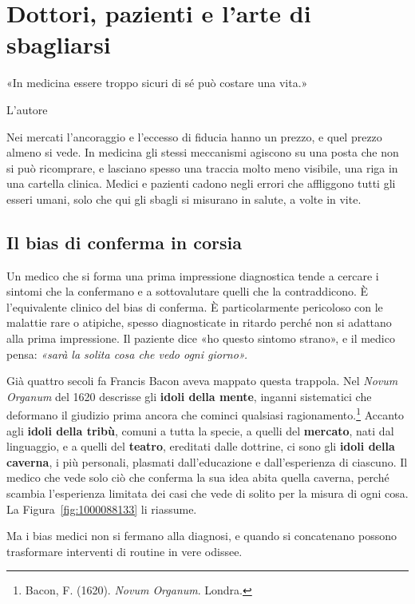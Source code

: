 \chapter{Dottori, pazienti e l'arte di sbagliarsi}
\label{cap:p2c15}

\epigraph{«In medicina essere troppo sicuri di sé può costare una vita.»}{L'autore}

Nei mercati l'ancoraggio e l'eccesso di fiducia hanno un prezzo, e quel prezzo almeno si vede. In medicina gli stessi meccanismi agiscono su una posta che non si pu\`{o} ricomprare, e lasciano spesso una traccia molto meno visibile, una riga in una cartella clinica. Medici e pazienti cadono negli errori che affliggono tutti gli esseri umani, solo che qui gli sbagli si misurano in salute, a volte in vite.

\section{Il bias di conferma in corsia}

Un medico che si forma una prima impressione diagnostica tende a cercare i sintomi che la confermano e a sottovalutare quelli che la contraddicono. \`{E} l'equivalente clinico del bias di conferma. \`{E} particolarmente pericoloso con le malattie rare o atipiche, spesso diagnosticate in ritardo perch\'{e} non si adattano alla prima impressione. Il paziente dice «ho questo sintomo strano», e il medico pensa: \textit{«sar\`{a} la solita cosa che vedo ogni giorno».}

Gi\`{a} quattro secoli fa Francis Bacon aveva mappato questa trappola. Nel \textit{Novum Organum} del 1620 descrisse gli \textbf{idoli della mente}, inganni sistematici che deformano il giudizio prima ancora che cominci qualsiasi ragionamento.\footnote{Bacon, F. (1620). \textit{Novum Organum}. Londra.} Accanto agli \textbf{idoli della trib\`{u}}, comuni a tutta la specie, a quelli del \textbf{mercato}, nati dal linguaggio, e a quelli del \textbf{teatro}, ereditati dalle dottrine, ci sono gli \textbf{idoli della caverna}, i pi\`{u} personali, plasmati dall'educazione e dall'esperienza di ciascuno. Il medico che vede solo ci\`{o} che conferma la sua idea abita quella caverna, perch\'{e} scambia l'esperienza limitata dei casi che vede di solito per la misura di ogni cosa. La Figura~\ref{fig:1000088133} li riassume.

Ma i bias medici non si fermano alla diagnosi, e quando si concatenano possono trasformare interventi di routine in vere odissee.

